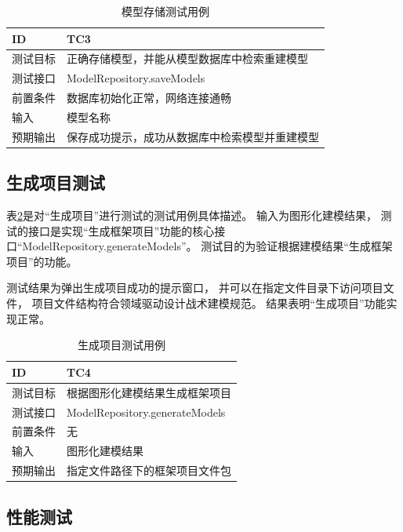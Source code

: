 {\footnotesize
\begin{longtable}[h]{m{80pt}|m{305pt}}
    \caption[模型存储测试用例]{模型存储测试用例} \label{testcase3} \\
        \hline
        ID&TC3\\
        \hline
        测试目标&正确存储模型，并能从模型数据库中检索重建模型\\
        \hline
        测试接口&ModelRepository.saveModels\\
        \hline
        前置条件&数据库初始化正常，网络连接通畅\\
        \hline
        输入& 模型名称\\
        \hline
        预期输出& 保存成功提示，成功从数据库中检索模型并重建模型\\
        \hline 

\end{longtable} 
}

\subsection{生成项目测试}

表\ref{testcase4}是对“生成项目”进行测试的测试用例具体描述。
输入为图形化建模结果，
测试的接口是实现“生成框架项目”功能的核心接口“ModelRepository.generateModels”。
测试目的为验证根据建模结果“生成框架项目”的功能。

测试结果为弹出生成项目成功的提示窗口，
并可以在指定文件目录下访问项目文件，
项目文件结构符合领域驱动设计战术建模规范。
结果表明“生成项目”功能实现正常。

{\footnotesize
\begin{longtable}[h]{m{80pt}|m{305pt}}
    \caption[生成项目测试用例]{生成项目测试用例} \label{testcase4} \\
        \hline  
        ID&TC4\\
        \hline
        测试目标&根据图形化建模结果生成框架项目\\
        \hline
        测试接口&ModelRepository.generateModels\\
        \hline
        前置条件&无\\
        \hline
        输入& 图形化建模结果\\
        \hline
        预期输出& 指定文件路径下的框架项目文件包\\
        \hline
\end{longtable} 
}

\subsection{性能测试}

